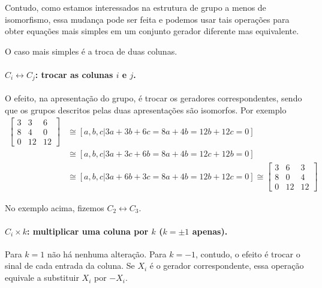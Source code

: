     	\par\vspace{0.3cm} Contudo, como estamos interessados na estrutura de grupo a menos de isomorfismo, 
    	essa mudança pode ser feita e podemos usar tais operações para obter equações mais simples em um 
    	conjunto gerador diferente mas equivalente.
    	
    	\par\vspace{0.3cm} O caso mais simples é a troca de duas colunas. 
    	
    	\paragraph{$C_i\leftrightarrow C_j$: trocar as colunas $i$ e $j$.} O efeito, na apresentação do grupo, 
    	é trocar os geradores correspondentes, sendo que os grupos descritos pelas duas apresentações são
    	isomorfos. Por exemplo
    	\begin{align*}
        	\begin{bmatrix}
        	3 & 3 & 6 \\
        	8 & 4 & 0 \\
        	0 & 12 & 12
        	\end{bmatrix} 
        	&\cong [ a,b,c \vert 3a+3b+6c=8a+4b=12b+12c=0 ] \\ 
        	&\cong [ a,b,c \vert 3a+3c+6b=8a+4b=12c+12b=0 ] \\ 
        	&\cong [ a,b,c \vert 3a+6b+3c=8a+4b=12b+12c=0 ] 
        	\cong 
        	\begin{bmatrix}
        	3 & 6 & 3 \\
        	8 & 0 & 4 \\
        	0 & 12 & 12
        	\end{bmatrix}
    	\end{align*}
    	\par\vspace{0.3cm} No exemplo acima, fizemos $C_2\leftrightarrow C_3$.
    	
    	\paragraph{$C_i\times k$: multiplicar uma coluna por $k$ ($k=\pm1$ apenas).} Para $k=1$ não há nenhuma
    	alteração. Para $k=-1$, contudo, o efeito é trocar o sinal de cada entrada da coluna. Se $X_i$ é o 
    	gerador correspondente, essa operação equivale a substituir $X_i$ por $-X_i$.
    	
